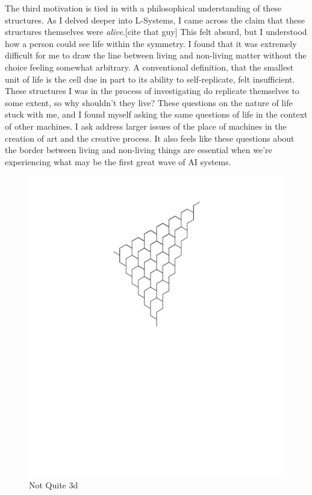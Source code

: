 \documentclass[12pt,twoside]{reedthesis}
\begin{document}
	The third motivation is tied in with a philosophical understanding of these structures. As I delved deeper into L-Systems, I came across the claim that these structures themselves were \textit{alive}.[cite that guy] This felt absurd, but I understood how a person could see life within the symmetry. I found that it was extremely difficult for me to draw the line between living and non-living matter without the choice feeling somewhat arbitrary. A conventional definition, that the smallest unit of life is the cell due in part to its ability to self-replicate, felt insufficient. These structures I was in the process of investigating do replicate themselves to some extent, so why shouldn't they live? These questions on the nature of life stuck with me, and I found myself asking the same questions of life in the context of other machines. I ask address larger issues of the place of machines in the creation of art and the creative process. It also feels like these questions about the border between living and non-living things are essential when we're experiencing what may be the first great wave of AI systems.

	\begin{figure}[h]
	\centering
	\includegraphics[clip=true, viewport=1in 6in 9in 11in, scale=0.4]{Images/ThePathWeWillFollow1}
	\caption[Not Quite 3d]{Not Quite 3d\footnotemark}
	\label {Motivations3}
	\end{figure}
\end{document}
